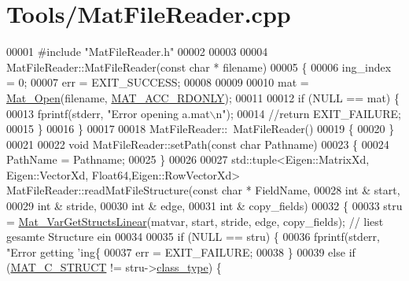 \hypertarget{_tools_2_mat_file_reader_8cpp_source}{}\section{Tools/\+Mat\+File\+Reader.cpp}
\label{_tools_2_mat_file_reader_8cpp_source}

\begin{DoxyCode}
00001 \textcolor{preprocessor}{#include "MatFileReader.h"}
00002 
00003 
00004 MatFileReader::MatFileReader(\textcolor{keyword}{const} \textcolor{keywordtype}{char} * filename)
00005 \{
00006     ing\_index = 0;
00007     err = EXIT\_SUCCESS;
00008 
00009 
00010     mat = \hyperlink{group___m_a_t_gafbfedb5636a99f0ef867520c47f77d18}{Mat\_Open}(filename, \hyperlink{group___m_a_t_ggaa9dcbc70f538af79bd557593ff6b5cdba8dd1457651b27ba9bea6cfba158c037c}{MAT\_ACC\_RDONLY});
00011 
00012     \textcolor{keywordflow}{if} (NULL == mat) \{
00013         fprintf(stderr, \textcolor{stringliteral}{"Error opening a.mat\(\backslash\)n"});
00014         \textcolor{comment}{//return EXIT\_FAILURE;}
00015     \}
00016 \}
00017 
00018 MatFileReader::~MatFileReader()
00019 \{
00020 \}
00021 
00022 \textcolor{keywordtype}{void} MatFileReader::setPath(\textcolor{keyword}{const} \textcolor{keywordtype}{char} Pathname)
00023 \{
00024     PathName = Pathname;
00025 \}
00026 
00027 std::tuple<Eigen::MatrixXd, Eigen::VectorXd, Float64,Eigen::RowVectorXd> 
      MatFileReader::readMatFileStructure(\textcolor{keyword}{const} \textcolor{keywordtype}{char} * FieldName, 
00028                                                                                          \textcolor{keywordtype}{int} & start, 
00029                                                                                          \textcolor{keywordtype}{int} & stride, 
00030                                                                                          \textcolor{keywordtype}{int} & edge, 
00031                                                                                          \textcolor{keywordtype}{int} & copy\_fields)
00032 \{
00033     stru = \hyperlink{group___m_a_t_gaa56680fb7b2cd3d410f659e945da8141}{Mat\_VarGetStructsLinear}(matvar, start, stride, edge, copy\_fields); \textcolor{comment}{//
       liest gesamte Structure ein}
00034 
00035     \textcolor{keywordflow}{if} (NULL == stru) \{
00036         fprintf(stderr, \textcolor{stringliteral}{"Error getting 'ing\{%
00037         err = EXIT\_FAILURE;
00038     \}
00039     \textcolor{keywordflow}{else} \textcolor{keywordflow}{if} (\hyperlink{group___m_a_t_ggad4d60ae7b709fc81bfd744fb4c857c40acb467c7749c80902b798134c729bb521}{MAT\_C\_STRUCT} != stru->\hyperlink{group___m_a_t_aff13035bf3265dd7d9425e5d40c839d4}{class\_type}) \{
}
\end{DoxyCode}
